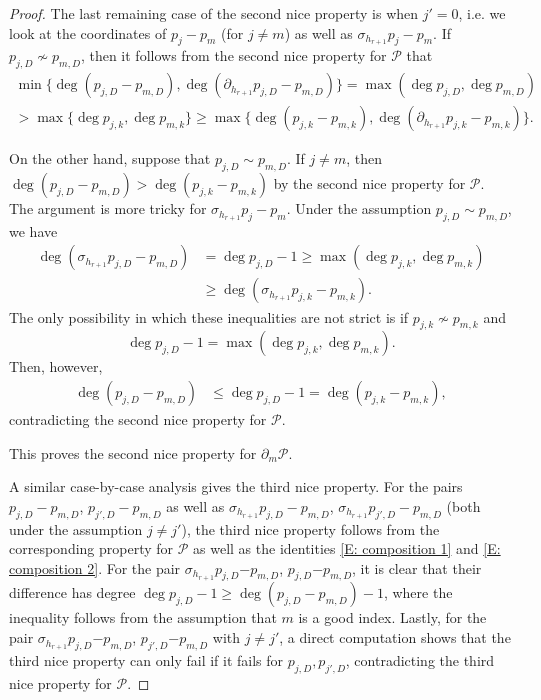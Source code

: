 \documentclass[11pt]{amsart}
\theoremstyle{definition}
\newcommand{\CP}{{\mathcal P}}
\newcommand{\1}{{\mathbf{1}}}
\begin{document}
\begin{proof}
{The last remaining case of the second nice property is when $j' = 0$, i.e. we look at the coordinates of $p_j - p_m$ (for $j\neq m$) as well as $\sigma_{h_{r+1}}p_j-p_m$. If $p_{j,D}\nsim p_{m,D}$, then it follows from the second nice property for $\CP$ that
    \begin{multline*}
        \min\{\deg(p_{j,D}-p_{m,D}),\deg(\partial_{h_{r+1}}p_{j,D}-p_{m,D})\}=\max(\deg p_{j,D}, \deg p_{m,D})
        \\>\max\{\deg p_{j,k},\deg p_{m,k}\}\geq \max\{\deg(p_{j,k}-p_{m,k}),\deg(\partial_{h_{r+1}}p_{j,k}-p_{m,k})\}.
    \end{multline*}


    On the other hand, suppose that $p_{j,D}\sim p_{m,D}$. If $j\neq m$, then $\deg (p_{j,D}-p_{m,D})>\deg(p_{j,k}-p_{m,k})$ by the second nice property for $\CP$.
    The argument is more tricky for $\sigma_{h_{r+1}}p_j-p_m$. Under the assumption $p_{j,D}\sim p_{m,D}$, we have
    \begin{align*}
        \deg (\sigma_{h_{r+1}}p_{j,D} - p_{m,D}) &= \deg p_{j,D}-1 \geq \max(\deg p_{j,k},\deg p_{m,k})\\
        &\geq \deg(\sigma_{h_{r+1}}p_{j,k}-p_{m,k}).
    \end{align*}
    The only possibility in which these inequalities are not strict is if $p_{j,k}\not\sim p_{m,k}$ and $$\deg p_{j,D}-1 = \max(\deg p_{j,k},\deg p_{m,k}).$$
    Then, however,
    \begin{align*}
        \deg (p_{j,D} - p_{m,D}) &\leq \deg p_{j,D}-1 = \deg(p_{j,k}-p_{m,k}),
    \end{align*}
    contradicting the second nice property for $\CP$.} This proves the second nice property for $\partial_{m}\CP$.
    

A similar case-by-case analysis gives the third nice property. For the pairs $p_{j,D}-p_{m,D}$, $p_{j',D}-p_{m,D}$ as well as $\sigma_{h_{r+1}}p_{j,D}-p_{m,D}$, $\sigma_{h_{r+1}}p_{j',D}-p_{m,D}$ (both under the assumption $j\neq j'$), the third nice property follows from the corresponding property for $\CP$ as well as 
the identities \eqref{E: composition 1} and \eqref{E: composition 2}. 
For the pair $\sigma_{h_{r+1}}p_{j,D}{-p_{m,D}}$, $p_{j,D}{-p_{m,D}}$, it is clear that their difference has degree {$\deg p_{j,D}-1\geq \deg (p_{j,D}-p_{m,D})-1$, where the inequality follows from the assumption that $m$ is a good index}. 
Lastly, for the pair $\sigma_{h_{r+1}}p_{j,D}{-p_{m,D}}$, $p_{j',D}{-p_{m,D}}$ with $j\neq j'$, a direct computation shows that the third nice property can only fail if it fails for $p_{j,D}, p_{j',D}$, contradicting the third nice property for $\CP$. 



\end{proof}
\end{document}

